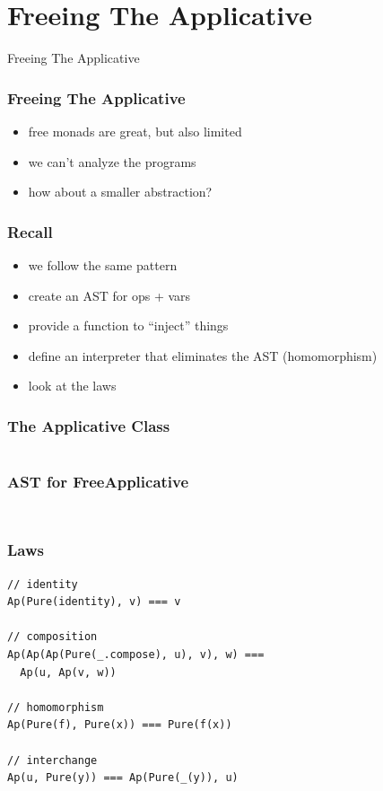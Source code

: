 \documentclass{beamer}
\newcommand{\recipe}{%
  \begin{itemize}
  \item create an AST for ops + vars
  \item provide a function to ``inject'' things
  \item define an interpreter that eliminates the AST (homomorphism)
  \item look at the laws
  \end{itemize}
}
\begin{document}
\section{Freeing The Applicative}\label{sec:free-applicative}
\begin{frame}
  \begin{center}
    \Huge
    Freeing The Applicative
  \end{center}
\end{frame}

\begin{frame}
  \frametitle{Freeing The Applicative}
  \begin{itemize}
  \item free monads are great, but also limited
  \item we can't analyze the programs
  \item how about a smaller abstraction?
  \end{itemize}
\end{frame}

\begin{frame}
  \frametitle{Recall}
  \begin{itemize}
  \item we follow the same pattern
  \end{itemize}
  \recipe{}
\end{frame}

\begin{frame}[fragile]
  \frametitle{The Applicative Class}
  \inputminted{scala}{snippets/applicative-typeclass.scala}
\end{frame}

\begin{frame}[fragile]
  \frametitle{AST for FreeApplicative}
    \inputminted{scala}{snippets/free-applicative.scala}
  \begin{verbatim}
\end{verbatim}
\end{frame}

\begin{frame}[fragile]
  \frametitle{Laws}
\begin{verbatim}
// identity
Ap(Pure(identity), v) === v

// composition
Ap(Ap(Ap(Pure(_.compose), u), v), w) ===
  Ap(u, Ap(v, w))

// homomorphism
Ap(Pure(f), Pure(x)) === Pure(f(x))

// interchange
Ap(u, Pure(y)) === Ap(Pure(_(y)), u)
\end{verbatim}
\end{frame}
\end{document}
